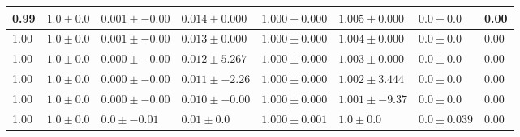\begin{tabular}{L{1in}|L{1in}|L{1in}|L{1in}|L{1in}|L{1in}|L{1in}|L{1in}}
0.99& $1.0  \pm  0.0$ & $0.001  \pm  -0.00$ & $0.014  \pm  0.000$ & $1.000  \pm  0.000$ & $1.005  \pm  0.000$ & $0.0  \pm  0.0$ &0.00\\& $1.0  \pm  0.0$ & $0.001  \pm  -0.00$ & $0.013  \pm  0.000$ & $1.000  \pm  0.000$ & $1.004  \pm  0.000$ & $0.0  \pm  0.0$ &0.00\\& $1.0  \pm  0.0$ & $0.000  \pm  -0.00$ & $0.012  \pm  5.267$ & $1.000  \pm  0.000$ & $1.003  \pm  0.000$ & $0.0  \pm  0.0$ &0.00\\& $1.0  \pm  0.0$ & $0.000  \pm  -0.00$ & $0.011  \pm  -2.26$ & $1.000  \pm  0.000$ & $1.002  \pm  3.444$ & $0.0  \pm  0.0$ &0.00\\& $1.0  \pm  0.0$ & $0.000  \pm  -0.00$ & $0.010  \pm  -0.00$ & $1.000  \pm  0.000$ & $1.001  \pm  -9.37$ & $0.0  \pm  0.0$ &0.00\\& $1.0  \pm  0.0$ & $0.0  \pm  -0.01$ & $0.01  \pm  0.0$ & $1.000  \pm  0.001$ & $1.0  \pm  0.0$ & $0.0  \pm  0.039$ &0.00\\\hline
\hline\end{tabular}

